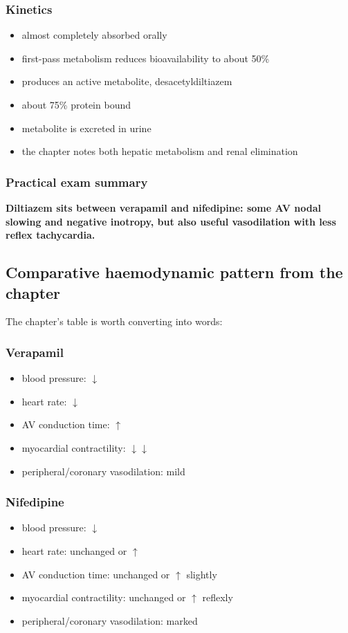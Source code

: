\documentclass[11pt,a4paper]{article}
\begin{document}
\subsubsection*{Kinetics}
\begin{itemize}
    \item almost completely absorbed orally
    \item first-pass metabolism reduces bioavailability to about 50\%
    \item produces an active metabolite, desacetyldiltiazem
    \item about 75\% protein bound
    \item metabolite is excreted in urine
    \item the chapter notes both hepatic metabolism and renal elimination
\end{itemize}

\subsubsection*{Practical exam summary}

\textbf{Diltiazem sits between verapamil and nifedipine: some AV nodal slowing and negative inotropy, but also useful vasodilation with less reflex tachycardia.}

\subsection{Comparative haemodynamic pattern from the chapter}

The chapter's table is worth converting into words:

\subsubsection*{Verapamil}
\begin{itemize}
    \item blood pressure: $\downarrow$
    \item heart rate: $\downarrow$
    \item AV conduction time: $\uparrow$
    \item myocardial contractility: $\downarrow\downarrow$
    \item peripheral/coronary vasodilation: mild
\end{itemize}

\subsubsection*{Nifedipine}
\begin{itemize}
    \item blood pressure: $\downarrow$
    \item heart rate: unchanged or $\uparrow$
    \item AV conduction time: unchanged or $\uparrow$ slightly
    \item myocardial contractility: unchanged or $\uparrow$ reflexly
    \item peripheral/coronary vasodilation: marked
\end{itemize}
\end{document}
